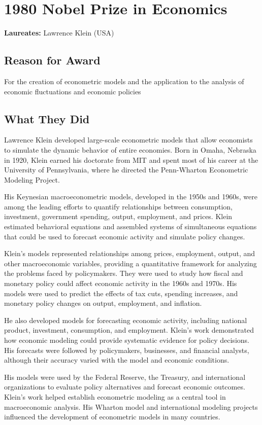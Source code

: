 \chapter{1980 Nobel Prize in Economics}
\textbf{Laureates: }Lawrence Klein (USA)

\section*{Reason for Award}
For the creation of econometric models and the application to the analysis of
economic fluctuations and economic policies

\section{What They Did}
Lawrence Klein developed large-scale econometric models that allow economists to
simulate the dynamic behavior of entire economies. Born in Omaha, Nebraska
in 1920, Klein earned his doctorate from MIT and spent most of his career at
the University of Pennsylvania, where he directed the Penn-Wharton Econometric
Modeling Project.

His Keynesian macroeconometric models, developed in the 1950s and 1960s, were
among the leading efforts to quantify relationships between consumption,
investment, government spending, output, employment, and prices. Klein estimated
behavioral equations and assembled systems of simultaneous equations that could
be used to forecast economic activity and simulate policy changes.

Klein's models represented relationships among prices, employment, output, and
other macroeconomic variables, providing a quantitative framework for analyzing
the problems faced by policymakers. They were used to study how fiscal and
monetary policy could affect economic activity in the 1960s and 1970s.
His models were used to predict the effects of tax cuts, spending increases,
and monetary policy changes on output, employment, and inflation.

He also developed models for forecasting economic activity, including national
product, investment, consumption, and employment. Klein's work demonstrated how
economic modeling could provide systematic evidence for policy decisions. His
forecasts were followed by policymakers, businesses, and financial analysts,
although their accuracy varied with the model and economic conditions.

His models were used by the Federal Reserve, the Treasury, and international
organizations to evaluate policy alternatives and forecast economic outcomes.
Klein's work helped establish econometric modeling as a central tool in
macroeconomic analysis. His Wharton model and international modeling projects
influenced the development of econometric models in many countries.

